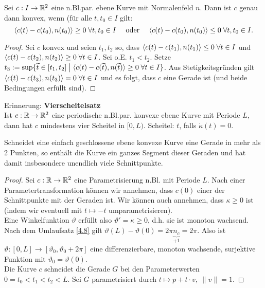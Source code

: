 \documentclass[11pt]{scrbook}
\newcommand{\tta}{\vartheta}
\begin{document}
\begin{lem}
Sei $c: I  \to \mathbb{R}^2$ eine n.Bl.par. ebene Kurve mit Normalenfeld $n$. Dann ist $c$ genau dann konvex, wenn (für alle $t, t_0 \in I$ gilt:
\[ \langle c(t) - c(t_0), n(t_0) \rangle \geq 0 \; \forall t, t_0 \in I \quad \text{ oder } \quad \langle c(t) - c(t_0) , n(t_0) \rangle \leq 0 \; \forall t, t_0 \in I. \]
\begin{proof}
Sei $c$ konvex und seien $t_1, t_2$ so, dass $\langle c(t) - c(t_1), n(t_1) \rangle \leq 0 \; \forall t \in I$ und $\langle c(t) - c(t_2), n(t_2) \rangle \geq 0 \; \forall t \in I$. Sei o.E. $t_1 < t_2$. Setze $t_3 := \sup \{\widetilde t \in [t_1, t_2] \; \big| \; \langle c(t) - c(\widetilde t), n(\widetilde t) \rangle \geq 0 \; \forall t \in I \}$. Aus Stetigkeitsgründen gilt $\langle c(t) - c(t_3), n(t_3) \rangle = 0 \; \forall t \in I$ und es folgt, dass $c$ eine Gerade ist (und beide Bedingungen erfüllt sind).
\end{proof}
\end{lem}


\newpage
\setcounter{thm}{7}
Erinnerung: \textbf{Vierscheitelsatz} \\
Ist $c: \mathbb{R} \to \mathbb{R}^2$ eine periodische n.Bl.par. konvexe ebene Kurve mit Periode $L$, dann hat $c$ mindestens vier Scheitel in $[0, L)$. Scheitel: $t$, falls $\dot \kappa(t) = 0$.

\begin{lem}
\label{5.8}
Schneidet eine einfach geschlossene ebene konvexe Kurve eine Gerade in mehr als 2 Punkten, so enthält die Kurve ein ganzes Segment dieser Geraden und hat damit insbesondere unendlich viele Schnittpunkte. \\
\begin{proof}
Sei $c: \mathbb{R} \to \mathbb{R}^2$ eine Parametrisierung n.Bl. mit Periode $L$. Nach einer Parametertransformation können wir annehmen, dass $c(0)$ einer der Schnittpunkte mit der Geraden ist. Wir können auch annehmen, dass $\kappa \geq 0$ ist (indem wir eventuell mit $t \mapsto -t$ umparametrisieren). \\
Eine Winkelfunktion $\tta$ erfüllt also $\tta' = \kappa \geq 0$, d.h. sie ist monoton wachsend. Nach dem Umlaufsatz \ref{4.8} gilt $\tta(L) - \tta(0) = 2 \pi \underbrace{n_c}_{+1} = 2 \pi$. Also ist $\tta : [0, L] \to [\tta_0, \tta_0 + 2 \pi]$ eine differenzierbare, monoton wachsende, surjektive Funktion mit $\tta_0 = \tta(0)$. \\
Die Kurve $c$ schneidet die Gerade $G$ bei den Parameterwerten $0 = t_0 < t_1 < t_2 < L$. Sei $G$ parametrisiert durch $t \mapsto p + t \cdot v, \; \| v \| = 1$. 
\end{proof}
\end{lem}



\end{document}
